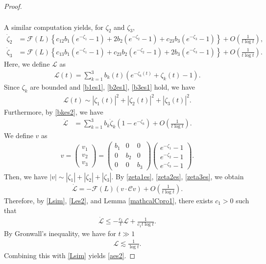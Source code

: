 \documentclass[reqno]{amsart}
\theoremstyle{plain}
\theoremstyle{definition}
\numberwithin{equation}{section}
\newcommand{\1}{\mathbbm{1}}
\begin{document}
\begin{proof}
\begin{align}
\begin{aligned}
\end{aligned}
\end{align}
A similar computation yields, for $\zeta_2$ and $\zeta_3$,
\begin{align}
\dot{\zeta}_2&=\mathcal{F}(L)\left\{c_{12}b_1(e^{-\zeta_1}-1)+2b_2(e^{-\zeta_2}-1)+c_{23}b_3(e^{-\zeta_3}-1) \right\}+O\left(\frac{1}{t\log{t}}\right), \label{zeta2es}
\\
\dot{\zeta}_3&=\mathcal{F}(L)\left\{c_{13}b_1(e^{-\zeta_1}-1)+c_{23}b_2(e^{-\zeta_2}-1)+2b_3(e^{-\zeta_3}-1) \right\}+O\left(\frac{1}{t\log{t}}\right). \label{zeta3es}
\end{align}
Here, we define $\mathcal{L}$ as
\begin{align}\label{mathcalLdef}
\mathcal{L}(t)=\sum_{k=1}^3 b_k(t)\left(e^{-\zeta_k(t)}+\zeta_k(t)-1\right).
\end{align}
Since $\zeta_k$ are bounded and \eqref{b1es1}, \eqref{b2es1}, \eqref{b3es1} hold, we have
\begin{align}\label{Lsim}
\mathcal{L}(t)\sim |\zeta_1(t)|^2+|\zeta_2(t)|^2+|\zeta_3(t)|^2.
\end{align}
Furthermore, by \eqref{bkes2}, we have
\begin{align}\label{Lbibunes}
\dot{\mathcal{L}}&=\sum_{k=1}^3 b_k\dot{\zeta}_k(1-e^{-\zeta_k})+O\left(\frac{1}{t\log{t}}\right).
\end{align}
We define $v$ as
\begin{align*}
v=
\begin{pmatrix}
v_1
\\
v_2
\\
v_3
\end{pmatrix}
=
\begin{pmatrix}
b_1&0&0
\\
0&b_2&0
\\
0&0&b_3
\end{pmatrix}
\begin{pmatrix}
e^{-\zeta_1}-1
\\
e^{-\zeta_2}-1
\\
e^{-\zeta_3}-1
\end{pmatrix}
.
\end{align*}
Then, we have $|v|\sim |\zeta_1|+|\zeta_2|+|\zeta_3|$. By \eqref{zeta1es}, \eqref{zeta2es}, \eqref{zeta3es}, we obtain
\begin{align}\label{Les2}
\dot{\mathcal{L}}=-\mathcal{F}(L)(v\cdot \mathcal{C}v)+O\left(\frac{1}{t\log{t}}\right).
\end{align}
Therefore, by \eqref{Lsim}, \eqref{Les2}, and Lemma \ref{mathcalCpro1}, there exists $c_1>0$ such that
\begin{align*}
\dot{\mathcal{L}}\leq -\frac{c_1}{t}\mathcal{L}+\frac{1}{c_1t\log{t}}.
\end{align*}
By Gronwall's inequality, we have for $t\gg 1$
\begin{align*}
\mathcal{L}\lesssim \frac{1}{\log{t}}.
\end{align*}
Combining this with \eqref{Lsim} yields \eqref{aes2}.
\end{proof}
\end{document}

